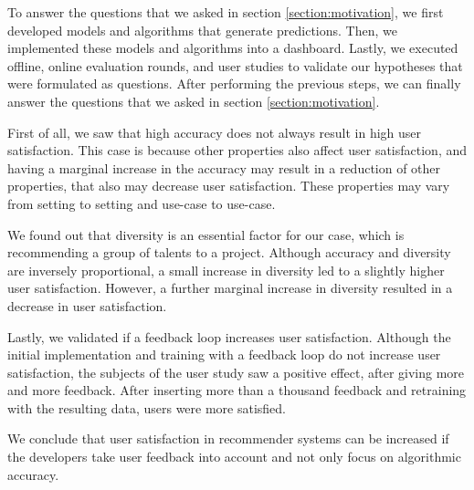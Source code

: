 To answer the questions that we asked in section \ref{section:motivation}, we first developed models and algorithms that generate predictions. Then, we implemented these models and algorithms into a dashboard. Lastly, we executed offline, online evaluation rounds, and user studies to validate our hypotheses that were formulated as questions. After performing the previous steps, we can finally answer the questions that we asked in section \ref{section:motivation}. 

First of all, we saw that high accuracy does not always result in high user satisfaction. This case is because other properties also affect user satisfaction, and having a marginal increase in the accuracy may result in a reduction of other properties, that also may decrease user satisfaction. These properties may vary from setting to setting and use-case to use-case. 

We found out that diversity is an essential factor for our case, which is recommending a group of talents to a project. Although accuracy and diversity are inversely proportional, a small increase in diversity led to a slightly higher user satisfaction. However, a further marginal increase in diversity resulted in a decrease in user satisfaction. 

Lastly, we validated if a feedback loop increases user satisfaction. Although the initial implementation and training with a feedback loop do not increase user satisfaction, the subjects of the user study saw a positive effect, after giving more and more feedback. After inserting more than a thousand feedback and retraining with the resulting data, users were more satisfied.

We conclude that user satisfaction in recommender systems can be increased if the developers take user feedback into account and not only focus on algorithmic accuracy.